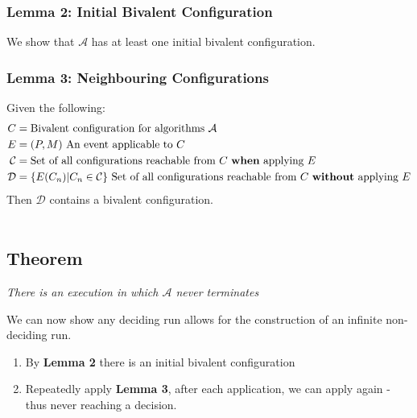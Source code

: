 \subsubsection{Lemma 2: Initial Bivalent Configuration}
We show that $\mathcal{A}$ has at least one initial bivalent configuration.
\unfinished

%
% 


\subsubsection{Lemma 3: Neighbouring Configurations}
Given the following:
\[\begin{split}
        C & = \text{Bivalent configuration for algorithms } \mathcal{A} \\
        E & = (P, M)  \text{ An event applicable to } C \\
        \mathcal{C} & = \text{Set of all configurations reachable from } C \text{ \textbf{when} applying } E \\
        \mathcal{D} & = \{E(C_n) | C_n \in \mathcal{C}\}  \text{ Set of all configurations reachable from } C \text{ \textbf{without} applying } E \\
    \end{split}\]
Then $\mathcal{D}$ contains a bivalent configuration.
\\ \toimprove
\\ \unfinished

\subsection{Theorem}
\centerline{\textit{There is an execution in which $\mathcal{A}$ never terminates}}
We can now show any deciding run allows for the construction of an infinite non-deciding run.
\begin{enumerate}
    \item By \textbf{Lemma 2} there is an initial bivalent configuration
    \item Repeatedly apply \textbf{Lemma 3}, after each application, we can apply again - thus never reaching a decision.
\end{enumerate}

